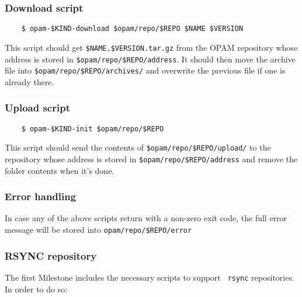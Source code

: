 \documentclass[a4paper,11pt]{article}
\begin{document}
\subsubsection{Download script}
\label{script-download}

\begin{verbatim}
    $ opam-$KIND-download $opam/repo/$REPO $NAME $VERSION
\end{verbatim}

This script should get \verb+$NAME.$VERSION.tar.gz+ from the OPAM
repository whose address is stored in \verb+$opam/repo/$REPO/address+.
It should then move the archive file into \verb+$opam/repo/$REPO/archives/+ and
overwrite the previous file if one is already there.

\subsubsection{Upload script}
\label{script-upload}

\begin{verbatim}
    $ opam-$KIND-init $opam/repo/$REPO
\end{verbatim}

This script should send the contents of
\verb+$opam/repo/$REPO/upload/+ to the repository whose address is
stored in \verb+$opam/repo/$REPO/address+ and remove the folder
contents when it's done.

\subsubsection{Error handling}
\label{script-error}

In case any of the above scripts return with a non-zero exit code, the
full error message will be stored into \verb+opam/repo/$REPO/error+

\subsubsection{RSYNC repository}

The first Milestone includes the necessary scripts to support {\tt
  rsync} repositories. In order to do so:
\end{document}
